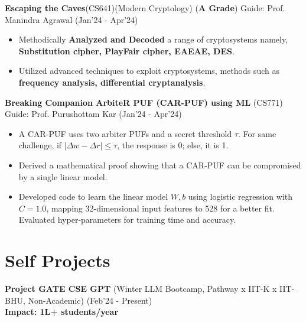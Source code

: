 \documentclass[10.8pt, a4paper]{extarticle}
\newcommand{\shorterSection}[1]{\vspace{-10pt}\section{#1}}
\begin{document}
\textbf{Escaping the Caves}(CS641)(Modern Cryptology) 
 (\textbf{A Grade}) Guide: Prof. Manindra Agrawal \href{https://github.com/souvikcseiitk/Escaping-the-Caves}{\faGithub{}} \hfill(Jan'24 - Apr'24)
    \\[-0.6cm]
	\begin{itemize}
	      \item  Methodically \textbf {Analyzed and Decoded} a range of cryptosystems namely, \textbf {Substitution cipher, PlayFair cipher, EAEAE,  DES}.\\[-0.6cm]
	      
	      \item  Utilized advanced techniques to exploit cryptosystems, methods such as\textbf { frequency analysis, differential cryptanalysis}.\\[-0.6cm]
	\end{itemize}
\vspace{2pt}

\textbf{Breaking Companion ArbiteR PUF (CAR-PUF) using ML} (CS771) Guide: Prof. Purushottam Kar \href{https://github.com/souvikcseiitk/Companion-Arbiter-PUF-broken-by-ML-attacks}{\faGithub{}} \hfill(Jan'24 - Apr'24)
	\\[-0.6cm]

 \begin{itemize}
    \item A CAR-PUF uses two arbiter PUFs and a secret threshold $\tau$. For same challenge, if $|\Delta w - \Delta r| \leq \tau$, the response is 0; else, it is 1.
    \item Derived a mathematical proof showing that a CAR-PUF can be compromised by a single linear model.
    \item Developed code to learn the linear model $W, b$ using logistic regression with $C=1.0$, mapping 32-dimensional input features to 528 for a better fit. Evaluated hyper-parameters for training time and accuracy.
\end{itemize}


\vspace{2pt}



\vspace{4pt}
\shorterSection{Self Projects}
\textbf{Project GATE CSE GPT} (Winter LLM Bootcamp, Pathway x IIT-K x IIT-BHU, Non-Academic) \href{https://github.com/souvikcseiitk/gate_cse_gpt}{\faGithub{}} \hfill(Feb'24 - Present) \\
         \textbf{Impact: 1L+ students/year} \\
         
\end{document}
